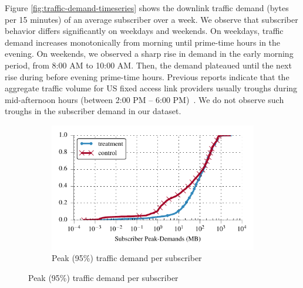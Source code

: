 Figure \ref{fig:traffic-demand-timeseries} shows the downlink traffic demand
(bytes per 15 minutes) of an average subscriber over a week.
We observe that subscriber behavior differs
significantly on weekdays and weekends. On weekdays, traffic demand 
increases monotonically from morning until prime-time hours in the evening. On 
weekends, we observed a sharp rise in demand in the early morning period, from
8:00 AM to 10:00 AM. Then, the demand plateaued until the next rise during before
evening prime-time hours. Previous reports indicate that the aggregate traffic volume
for US fixed access link providers usually troughs during mid-afternoon hours 
(between 2:00 PM -- 6:00 PM)~\cite{sandvine20141h}. We do not observe such troughs
in the subscriber demand in our dataset.

\begin{figure}[t]
\begin{minipage}{1\linewidth}
\centering
%
%
\begin{subfigure}[b]{1\linewidth}
\includegraphics[width=\linewidth]{figures/cdf_peak_demand-overall.pdf}
               \caption{Peak (95\%) traffic demand per subscriber\label{fig:CDF-data-rate-perc95}}
\end{subfigure}


\end{minipage}
\end{figure}
